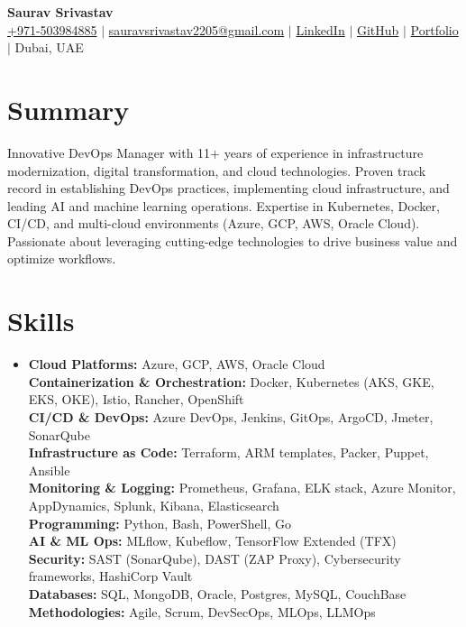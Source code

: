 \documentclass[letterpaper,11pt]{article}
\newcommand{\resumeItem}[1]{\item\small{#1}}
\newcommand{\resumeSubHeadingListStart}{\begin{itemize}[leftmargin=0.15in, label={}]}
\newcommand{\resumeSubHeadingListEnd}{\end{itemize}}
\begin{document}
\begin{center}
    {\Huge \textbf{Saurav Srivastav}} \\ \vspace{3pt}
    \small{
    \faPhone\hspace{.5pt} \href{tel:+971503984885}{+971-503984885} $|$
    \faEnvelope\hspace{.5pt} \href{mailto:sauravsrivastav2205@gmail.com}{sauravsrivastav2205@gmail.com} $|$
    \faLinkedin\hspace{.5pt} \href{https://www.linkedin.com/in/sauravsrivastav2205}{LinkedIn} $|$
    \faGithub\hspace{.5pt} \href{https://github.com/SauravSrivastav}{GitHub} $|$
    \faGlobe\hspace{.5pt} \href{https://sauravsrivastav.github.io/cv}{Portfolio} $|$
    \faMapMarker\hspace{.5pt} Dubai, UAE
    }
\end{center}

\section{Summary}
\small{Innovative DevOps Manager with 11+ years of experience in infrastructure modernization, digital transformation, and cloud technologies. Proven track record in establishing DevOps practices, implementing cloud infrastructure, and leading AI and machine learning operations. Expertise in Kubernetes, Docker, CI/CD, and multi-cloud environments (Azure, GCP, AWS, Oracle Cloud). Passionate about leveraging cutting-edge technologies to drive business value and optimize workflows.}

\section{Skills}
\resumeSubHeadingListStart
\resumeItem{
    \textbf{Cloud Platforms:} Azure, GCP, AWS, Oracle Cloud \\
    \textbf{Containerization \& Orchestration:} Docker, Kubernetes (AKS, GKE, EKS, OKE), Istio, Rancher, OpenShift \\
    \textbf{CI/CD \& DevOps:} Azure DevOps, Jenkins, GitOps, ArgoCD, Jmeter, SonarQube \\
    \textbf{Infrastructure as Code:} Terraform, ARM templates, Packer, Puppet, Ansible \\
    \textbf{Monitoring \& Logging:} Prometheus, Grafana, ELK stack, Azure Monitor, AppDynamics, Splunk, Kibana, Elasticsearch \\
    \textbf{Programming:} Python, Bash, PowerShell, Go \\
    \textbf{AI \& ML Ops:} MLflow, Kubeflow, TensorFlow Extended (TFX) \\
    \textbf{Security:} SAST (SonarQube), DAST (ZAP Proxy), Cybersecurity frameworks, HashiCorp Vault \\
    \textbf{Databases:} SQL, MongoDB, Oracle, Postgres, MySQL, CouchBase \\
    \textbf{Methodologies:} Agile, Scrum, DevSecOps, MLOps, LLMOps \\
}
\resumeSubHeadingListEnd
\end{document}
